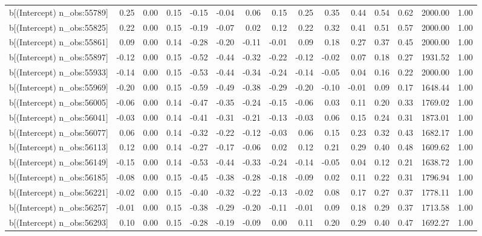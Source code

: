 \begin{table}[ht]
\begin{tabular}{rrrrrrrrrrrrrrr}
  b[(Intercept) n\_obs:55789] & 0.25 & 0.00 & 0.15 & -0.15 & -0.04 & 0.06 & 0.15 & 0.25 & 0.35 & 0.44 & 0.54 & 0.62 & 2000.00 & 1.00 \\ 
  b[(Intercept) n\_obs:55825] & 0.22 & 0.00 & 0.15 & -0.19 & -0.07 & 0.02 & 0.12 & 0.22 & 0.32 & 0.41 & 0.51 & 0.57 & 2000.00 & 1.00 \\ 
  b[(Intercept) n\_obs:55861] & 0.09 & 0.00 & 0.14 & -0.28 & -0.20 & -0.11 & -0.01 & 0.09 & 0.18 & 0.27 & 0.37 & 0.45 & 2000.00 & 1.00 \\ 
  b[(Intercept) n\_obs:55897] & -0.12 & 0.00 & 0.15 & -0.52 & -0.44 & -0.32 & -0.22 & -0.12 & -0.02 & 0.07 & 0.18 & 0.27 & 1931.52 & 1.00 \\ 
  b[(Intercept) n\_obs:55933] & -0.14 & 0.00 & 0.15 & -0.53 & -0.44 & -0.34 & -0.24 & -0.14 & -0.05 & 0.04 & 0.16 & 0.22 & 2000.00 & 1.00 \\ 
  b[(Intercept) n\_obs:55969] & -0.20 & 0.00 & 0.15 & -0.59 & -0.49 & -0.38 & -0.29 & -0.20 & -0.10 & -0.01 & 0.09 & 0.17 & 1648.44 & 1.00 \\ 
  b[(Intercept) n\_obs:56005] & -0.06 & 0.00 & 0.14 & -0.47 & -0.35 & -0.24 & -0.15 & -0.06 & 0.03 & 0.11 & 0.20 & 0.33 & 1769.02 & 1.00 \\ 
  b[(Intercept) n\_obs:56041] & -0.03 & 0.00 & 0.14 & -0.41 & -0.31 & -0.21 & -0.13 & -0.03 & 0.06 & 0.15 & 0.24 & 0.31 & 1873.01 & 1.00 \\ 
  b[(Intercept) n\_obs:56077] & 0.06 & 0.00 & 0.14 & -0.32 & -0.22 & -0.12 & -0.03 & 0.06 & 0.15 & 0.23 & 0.32 & 0.43 & 1682.17 & 1.00 \\ 
  b[(Intercept) n\_obs:56113] & 0.12 & 0.00 & 0.14 & -0.27 & -0.17 & -0.06 & 0.02 & 0.12 & 0.21 & 0.29 & 0.40 & 0.48 & 1609.62 & 1.00 \\ 
  b[(Intercept) n\_obs:56149] & -0.15 & 0.00 & 0.14 & -0.53 & -0.44 & -0.33 & -0.24 & -0.14 & -0.05 & 0.04 & 0.12 & 0.21 & 1638.72 & 1.00 \\ 
  b[(Intercept) n\_obs:56185] & -0.08 & 0.00 & 0.15 & -0.45 & -0.38 & -0.28 & -0.18 & -0.09 & 0.02 & 0.11 & 0.22 & 0.31 & 1796.94 & 1.00 \\ 
  b[(Intercept) n\_obs:56221] & -0.02 & 0.00 & 0.15 & -0.40 & -0.32 & -0.22 & -0.13 & -0.02 & 0.08 & 0.17 & 0.27 & 0.37 & 1778.11 & 1.00 \\ 
  b[(Intercept) n\_obs:56257] & -0.01 & 0.00 & 0.15 & -0.38 & -0.29 & -0.20 & -0.11 & -0.01 & 0.09 & 0.18 & 0.29 & 0.37 & 1713.58 & 1.00 \\ 
  b[(Intercept) n\_obs:56293] & 0.10 & 0.00 & 0.15 & -0.28 & -0.19 & -0.09 & 0.00 & 0.11 & 0.20 & 0.29 & 0.40 & 0.47 & 1692.27 & 1.00 \\ 

\end{tabular}
\end{table}
